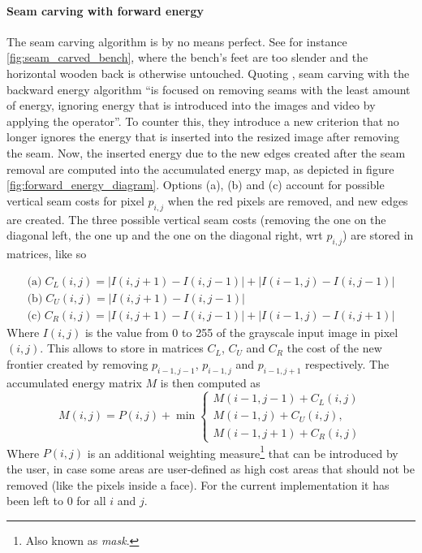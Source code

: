 \documentclass[../main.tex]{subfiles}
\begin{document}
\paragraph{Seam carving with forward energy}
The seam carving algorithm is by no means perfect. See for instance \ref{fig:seam_carved_bench}, where the bench's feet are too slender and the horizontal wooden back is otherwise untouched. Quoting \cite{seamcarving_improved}, seam carving with the backward energy algorithm ``is focused on removing seams with the least amount of energy, ignoring energy that is introduced into the images and video by applying the operator''. To counter this, they introduce a new criterion that no longer ignores the energy that is inserted into the resized image after removing the seam. Now, the inserted energy due to the new edges created after the seam removal are computed into the accumulated energy map, as depicted in figure \ref{fig:forward_energy_diagram}. Options (a), (b) and (c) account for possible vertical seam costs for pixel $p_{i,j}$ when the red pixels are removed, and new edges are created. The three possible vertical seam costs (removing the one on the diagonal left, the one up and the one on the diagonal right, wrt $p_{i,j}$) are stored in matrices, like so

\begin{equation}
    \begin{array}{l}
    \text{(a)} \; C_{L}(i, j)=|I(i, j+1)-I(i, j-1)|+|I(i-1, j)-I(i, j-1)| \\
    \text{(b)} \; C_{U}(i, j)=|I(i, j+1)-I(i, j-1)| \\
    \text{(c)} \; C_{R}(i, j)=|I(i, j+1)-I(i, j-1)|+|I(i-1, j)-I(i, j+1)|
    \end{array}
\end{equation}
Where $I(i, j)$ is the value from 0 to 255 of the grayscale input image in pixel $(i, j)$. This allows to store in matrices $C_{L}$, $C_{U}$ and $C_{R}$ the cost of the new frontier created by removing $p_{i-1, j-1}$, $p_{i-1, j}$ and $p_{i-1, j+1}$ respectively. The accumulated energy matrix $M$ is then computed as
\begin{equation}
    M(i, j)=P(i, j)+\min \left\{\begin{array}{l}
    M(i-1, j-1)+C_{L}(i, j) \\
    M(i-1, j)+C_{U}(i, j), \\
    M(i-1, j+1)+C_{R}(i, j)
    \end{array}\right.
\end{equation}
Where $P(i, j)$ is an additional weighting measure\footnote{Also known as \emph{mask}.} that can be introduced by the user, in case some areas are user-defined as high cost areas that should not be removed (like the pixels inside a face). For the current implementation it has been left to 0 for all $i$ and $j$.
\end{document}
